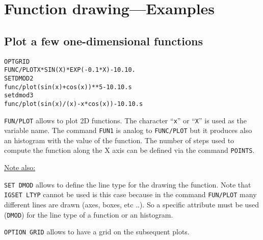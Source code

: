 \clearpage

\section{Function drawing---Examples}
\subsection{Plot a few one-dimensional functions}
\begin{alltt}
     OPT GRID
     FUNC/PLOT X*SIN(X)*EXP(-0.1*X)  -10. 10.
     SET DMOD 2
      func/plot (sin(x)+cos(x))**5    -10. 10. s
      set dmod 3
      func/plot (sin(x)/(x)-x*cos(x)) -10. 10. s
\end{alltt} 
\begin{DinglistE}
\item {\tt FUN/PLOT} allows to plot 2D functions. The character
      ``{\tt x}'' or ``{\tt X}'' is used as the variable name. The command
      {\tt FUN1} is analog to {\tt FUNC/PLOT}
      but it produces also an histogram with the value of the function.
      The number of steps used to compute the function along the X axis
      can be defined via the command {\tt POINTS}.

\underline{Note also:}

\item {\tt SET DMOD} allows to define the line type for the
      drawing the function. Note that {\tt IGSET LTYP} cannot be
      used is this case because in the command {\tt FUN/PLOT} many
      different lines are drawn (axes, boxes, etc ..). So a specific
      attribute must be used ({\tt DMOD}) for the line type of a function
      or an histogram.
\item {\tt OPTION GRID} allows to have a grid on the subsequent plots.
\end{DinglistE}

\clearpage

